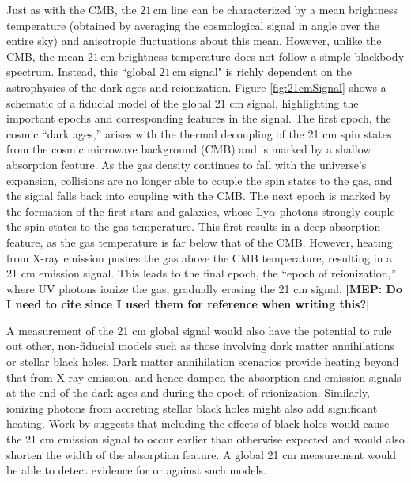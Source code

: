 \documentclass[twolcolumn,apj,iop,numberedappendix]{emulateapj}
\newcommand{\mep}[1]{{\color{applegreen} \textbf{[MEP:  #1]}}}
\begin{document}
Just as with the CMB, the $21\,\textrm{cm}$ line can be characterized by a mean brightness temperature (obtained by averaging the cosmological signal in angle over the entire sky) and anisotropic fluctuations about this mean. However, unlike the CMB, the mean $21\,\textrm{cm}$ brightness temperature does not follow a simple blackbody spectrum. Instead, this ``global $21\,\textrm{cm}$ signal" is richly dependent on the astrophysics of the dark ages and reionization. Figure \ref{fig:21cmSignal} shows a schematic of a fiducial model of the global 21 cm signal, highlighting the important epochs and corresponding features in the signal. The first epoch, the cosmic ``dark ages,'' arises with the thermal decoupling of the 21 cm spin states from the cosmic microwave background (CMB) and is marked by a shallow absorption feature. As the gas density continues to fall with the universe's expansion, collisions are no longer able to couple the spin states to the gas, and the signal falls back into coupling with the CMB. The next epoch is marked by the formation of the first stars and galaxies, whose Ly$\alpha$ photons strongly couple the spin states to the gas temperature. This first results in a deep absorption feature, as the gas temperature is far below that of the CMB. However, heating from X-ray emission pushes the gas above the CMB temperature, resulting in a 21 cm emission signal. This leads to the final epoch, the ``epoch of reionization,'' where UV photons ionize the gas, gradually erasing the 21 cm signal. \mep{Do I need to cite \citet{Pritchard_Loeb_21cm_Review} since I used them for reference when writing this?} 

A measurement of the 21 cm global signal would also have the potential to rule out other, non-fiducial models such as those involving dark matter annihilations or stellar black holes. Dark matter annihilation scenarios provide heating beyond that from X-ray emission, and hence dampen the absorption and emission signals at the end of the dark ages and during the epoch of reionization. \citep{Valdes2013_DM} Similarly, ionizing photons from accreting stellar black holes might also add significant heating. Work by \citet{Mirabel_stellar_bh} suggests that including the effects of black holes would cause the 21 cm emission signal to occur earlier than otherwise expected and would also shorten the width of the absorption feature. A global 21 cm measurement would be able to detect evidence for or against such models. 
\end{document}
